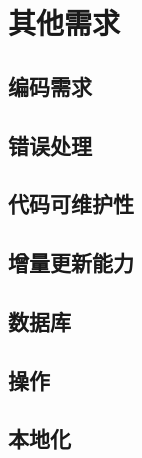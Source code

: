 \chapter{其他需求}
\section{编码需求}

\section{错误处理}

\section{代码可维护性}

\section{增量更新能力}

\section{数据库}

\section{操作}

\section{本地化}
